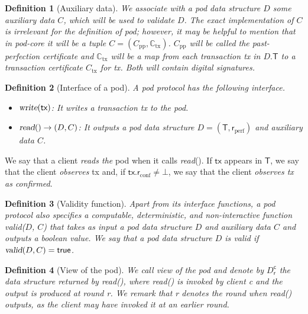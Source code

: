 \documentclass[pdflatex,sn-mathphys-num]{sn-jnl}%
\theoremstyle{thmstyleone}%
\theoremstyle{thmstyletwo}%
\theoremstyle{thmstylethree}%
\newtheorem{definition}{Definition}%
\newcommand{\podtm}{\textsf{pod}\xspace}
\newcommand{\true}{\mathsf{true}}
\newcommand{\op}[1]{\textsl{#1}}
\newcommand{\opwrite}[1]{\op{write}(#1)\xspace}
\newcommand{\opread}[1]{\op{read}(#1)\xspace}
\newcommand{\opreadall}[1]{\op{read}(#1)\xspace}
\newcommand{\opValid}[1]{\op{valid}(#1)\xspace}
\newcommand{\operand}[1]{\textsf{#1}}
\newcommand{\tx}{\operand{tx}\xspace}
\newcommand{\round}{\operand{r}\xspace}
\newcommand{\client}{\operand{c}\xspace}
\newcommand{\rconf}{\ensuremath{\round_\text{conf}}\xspace}
\newcommand{\rperf}{\ensuremath{\round_\text{perf}}\xspace}
\newcommand{\txcert}{\ensuremath{C_\text{tx}}\xspace}
\newcommand{\alltxcert}{\ensuremath{\mathbb{C}_\text{tx}}\xspace}
\newcommand{\ppcert}{\ensuremath{C_\text{pp}}\xspace}
\newcommand{\cert}{\ensuremath{C}\xspace}
\newcommand{\txSet}{\operand{T}\xspace}
\newcommand{\Pod}{\ensuremath{D}\xspace}
\newcommand{\podView}[2]{\ensuremath{\Pod_{#2}^{#1}}\xspace}
\newcommand{\returns}{\ensuremath{\rightarrow}\xspace}
\newcommand{\confirmed}{confirmed\xspace}
\begin{document}
\begin{definition}[Auxiliary data]
    We associate with a pod data structure $\Pod$ some auxiliary data \cert, which will be used to validate \Pod.
    The exact implementation of \cert is irrelevant for the definition of \podtm;
    however, it may be helpful to mention that in \podtm-core it will be a tuple $\cert = (\ppcert, \alltxcert)$.
    $\ppcert$ will be called the \emph{past-perfection certificate} and \alltxcert will be a map from each transaction \tx in $\Pod.\txSet$ to a \emph{transaction certificate} \txcert for \tx.
    Both will contain digital signatures.
\end{definition}

\begin{definition}[Interface of a \podtm]\label{def:podinterface}
A \podtm protocol has the following interface.
\begin{itemize}
    \item $\opwrite{\tx}$:
    It writes a transaction \tx to the \podtm.

    \item $\opreadall{} \returns (\Pod, \cert)$:
    It outputs a pod data structure $\Pod = (\txSet, \rperf)$ and auxiliary data \cert.
\end{itemize}
\end{definition}
We say that a client \emph{reads the} \podtm when it calls \opread{}.
If $\tx$ appears in $\txSet$,
 we say that the client \emph{observes} \tx and, if $\tx.\rconf \neq \bot$, we say that the client \emph{observes \tx as \confirmed}.

\begin{definition}[Validity function]
    Apart from its interface functions,
    a \podtm protocol also specifies a computable, deterministic, and non-interactive function \opValid{\Pod, \cert} that takes as input a pod data structure $\Pod$ and auxiliary data $\cert$ and outputs a boolean value. We say that a pod data structure $\Pod$ is \emph{valid} if $\opValid{\Pod, \cert} = \true$.
\end{definition}

\begin{definition}[View of the \podtm]
    We call \emph{view of the} \podtm and denote by \podView{\client}{\round} the data structure returned by \opreadall{}, where \opreadall{} is invoked by client \client and the output is produced at round \round.
    We remark that \round denotes the round when \opreadall{} outputs, as the client may have invoked it at an earlier round.
\end{definition}
\end{document}
